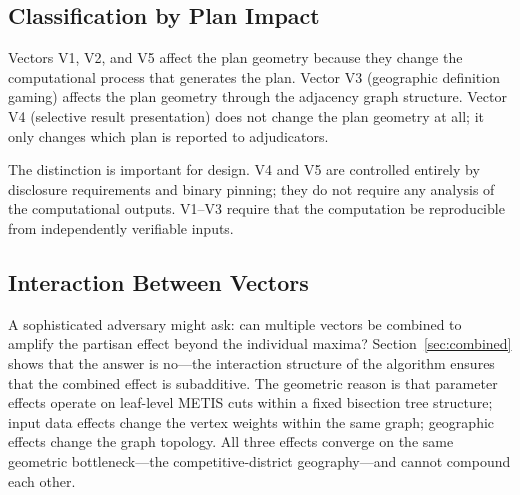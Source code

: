 \subsection{Classification by Plan Impact}

Vectors V1, V2, and V5 affect the plan geometry because they change the
computational process that generates the plan.
Vector V3 (geographic definition gaming) affects the plan geometry through
the adjacency graph structure.
Vector V4 (selective result presentation) does not change the plan geometry
at all; it only changes which plan is reported to adjudicators.

The distinction is important for \dia{} design.
V4 and V5 are controlled entirely by disclosure requirements and binary
pinning; they do not require any analysis of the computational outputs.
V1--V3 require that the computation be reproducible from independently
verifiable inputs.

\subsection{Interaction Between Vectors}

A sophisticated adversary might ask: can multiple vectors be combined
to amplify the partisan effect beyond the individual maxima?
Section~\ref{sec:combined} shows that the answer is no---the interaction
structure of the \bisect{} algorithm ensures that the combined effect is
subadditive.
The geometric reason is that parameter effects operate on leaf-level
METIS cuts within a fixed bisection tree structure; input data effects
change the vertex weights within the same graph; geographic effects change
the graph topology.
All three effects converge on the same geometric bottleneck---the
competitive-district geography---and cannot compound each other.
